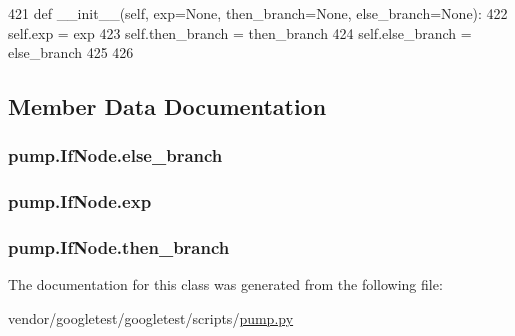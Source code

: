 \begin{DoxyCode}
421   \textcolor{keyword}{def }\_\_init\_\_(self, exp=None, then\_branch=None, else\_branch=None):
422     self.exp = exp
423     self.then\_branch = then\_branch
424     self.else\_branch = else\_branch
425 
426 
\end{DoxyCode}


\subsection{Member Data Documentation}
\subsubsection[{\texorpdfstring{else\+\_\+branch}{else_branch}}]{\setlength{\rightskip}{0pt plus 5cm}pump.\+If\+Node.\+else\+\_\+branch}\hypertarget{classpump_1_1IfNode_a12e422b16ed4291f15cd95cd6e7f81eb}{}\label{classpump_1_1IfNode_a12e422b16ed4291f15cd95cd6e7f81eb}
\subsubsection[{\texorpdfstring{exp}{exp}}]{\setlength{\rightskip}{0pt plus 5cm}pump.\+If\+Node.\+exp}\hypertarget{classpump_1_1IfNode_a92042e4262196ffd7366350539f512d8}{}\label{classpump_1_1IfNode_a92042e4262196ffd7366350539f512d8}
\subsubsection[{\texorpdfstring{then\+\_\+branch}{then_branch}}]{\setlength{\rightskip}{0pt plus 5cm}pump.\+If\+Node.\+then\+\_\+branch}\hypertarget{classpump_1_1IfNode_aa9e2e488564629f8dc0d64d165a19ffa}{}\label{classpump_1_1IfNode_aa9e2e488564629f8dc0d64d165a19ffa}


The documentation for this class was generated from the following file\+:\begin{DoxyCompactItemize}
\item 
vendor/googletest/googletest/scripts/\hyperlink{pump_8py}{pump.\+py}\end{DoxyCompactItemize}

